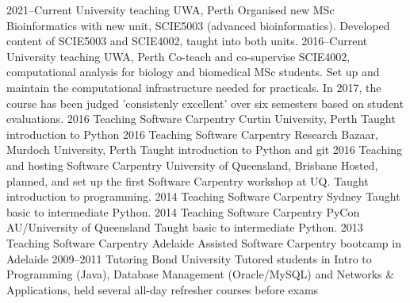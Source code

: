 \documentclass[]{friggeri-cv} %
\begin{document}
\begin{entrylist}
\entry
{2021--Current}
{University teaching}
{UWA, Perth}
{Organised new MSc Bioinformatics with new unit, SCIE5003 (advanced bioinformatics). Developed content of SCIE5003 and SCIE4002, taught into both units.}
\entry
{2016--Current}
{University teaching}
{UWA, Perth}
{Co-teach and co-supervise SCIE4002, computational analysis for biology and biomedical MSc students. Set up and maintain the computational infrastructure needed for practicals. In 2017, the course has been judged 'consistenly excellent' over six semesters based on student evaluations.}
\entry
{2016}
{Teaching Software Carpentry}
{Curtin University, Perth}
{Taught introduction to Python}
\entry
{2016}
{Teaching Software Carpentry}
{Research Bazaar, Murdoch University, Perth}
{Taught introduction to Python and git}
\entry
{2016}
{Teaching and hosting Software Carpentry}
{University of Queensland, Brisbane}
{Hosted, planned, and set up the first Software Carpentry workshop at UQ. Taught introduction to programming.}
\entry
{2014}
{Teaching Software Carpentry}
{Sydney}
{Taught basic to intermediate Python.}
\entry
{2014}
{Teaching Software Carpentry}
{PyCon AU/University of Queensland}
{Taught basic to intermediate Python.}
\entry
{2013}
{Teaching Software Carpentry}
{Adelaide}
{Assisted Software Carpentry bootcamp in Adelaide}
\entry
{2009--2011}
{Tutoring}
{Bond University}
{Tutored students in Intro to Programming (Java), Database Management (Oracle/MySQL) and Networks \& Applications, held several all-day refresher courses before exams}
\end{entrylist}
\end{document}
